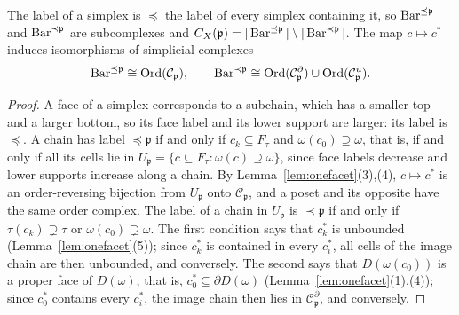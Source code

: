\begin{lemma}\label{lem:ordcx}
The label of a simplex is $\preceq$ the label of every simplex containing it, so $\operatorname{Bar}^{\preceq {\mathfrak p}}$ and $\operatorname{Bar}^{\prec {\mathfrak p}}$
are subcomplexes and $C_X({\mathfrak p})=|\operatorname{Bar}^{\preceq {\mathfrak p}}|\setminus|\operatorname{Bar}^{\prec {\mathfrak p}}|$. The map $c\mapsto c^*$ induces isomorphisms of
simplicial complexes
\[
\operatorname{Bar}^{\preceq {\mathfrak p}}\cong\operatorname{Ord}(\mathcal C_{\mathfrak p}),\qquad\operatorname{Bar}^{\prec {\mathfrak p}}\cong\operatorname{Ord}(\mathcal C_{\mathfrak p}^\partial)\cup
\operatorname{Ord}(\mathcal C_{\mathfrak p}^u).
\]
\end{lemma}
\begin{proof}
A face of a simplex corresponds to a subchain, which has a smaller top and a larger bottom, so its face label and its lower
support are larger: its label is $\preceq$. A chain has label $\preceq {\mathfrak p}$ if and only if $c_k\subseteq F_\tau$ and
$\omega(c_0)\supseteq\omega$, that is, if and only if all its cells lie in $U_{\mathfrak p}=\{c\subseteq F_\tau:\omega(c)\supseteq
\omega\}$, since face labels decrease and lower supports increase along a chain. By Lemma~\ref{lem:onefacet}(3),(4),
$c\mapsto c^*$ is an order-reversing bijection from $U_{\mathfrak p}$ onto $\mathcal C_{\mathfrak p}$, and a poset and its opposite have the same
order complex. The label of a chain in $U_{\mathfrak p}$ is $\prec {\mathfrak p}$ if and only if $\tau(c_k)\supsetneq\tau$ or
$\omega(c_0)\supsetneq\omega$. The first condition says that $c_k^*$ is unbounded (Lemma~\ref{lem:onefacet}(5)); since
$c_k^*$ is contained in every $c_i^*$, all cells of the image chain are then unbounded, and conversely. The second says
that $D(\omega(c_0))$ is a proper face of $D(\omega)$, that is, $c_0^*\subseteq\partial D(\omega)$
(Lemma~\ref{lem:onefacet}(1),(4)); since $c_0^*$ contains every $c_i^*$, the image chain then lies in $\mathcal
C_{\mathfrak p}^\partial$, and conversely.
\end{proof}

